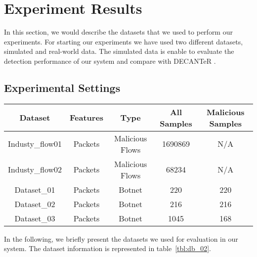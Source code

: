\section{Experiment Results}

In this section, we would describe the datasets that we used to perform our experiments. For starting our experiments we have used two different datasets, simulated and real-world data. The simulated data is enable to evaluate the detection performance of our system and compare with DECANTeR \cite{bortolameotti2017decanter}.


\subsection{Experimental Settings}

\begin{table*}[!h]
\centering
\caption{Overview of the Datasets}
\label{tbl:db_02}
\begin{tabular}{|c|c|c|c|c|}
\hline\hline
Dataset         & Features & Type            & All Samples & Malicious Samples \\ \hline
Industy\_flow01 & Packets  & Malicious Flows & 1690869     & N/A               \\ \hline
Industy\_flow02 & Packets  & Malicious Flows & 68234       & N/A               \\ \hline
Dataset\_01     & Packets  & Botnet          & 220         & 220               \\ \hline
Dataset\_02     & Packets  & Botnet          & 216         & 216               \\ \hline
Dataset\_03     & Packets  & Botnet          & 1045         & 168               \\ \hline\hline
\end{tabular}
\end{table*}


In the following, we briefly present the datasets we used for evaluation in our system. The dataset information is represented in table~\ref{tbl:db_02}.

